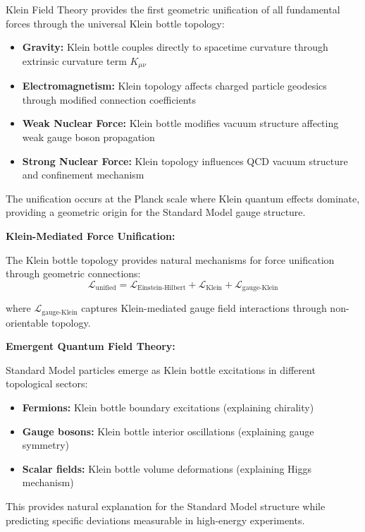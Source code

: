 \documentclass[12pt]{iopart}
\begin{document}
Klein Field Theory provides the first geometric unification of all fundamental forces through the universal Klein bottle topology:

\begin{itemize}
\item \textbf{Gravity:} Klein bottle couples directly to spacetime curvature through extrinsic curvature term $K_{\mu\nu}$
\item \textbf{Electromagnetism:} Klein topology affects charged particle geodesics through modified connection coefficients  
\item \textbf{Weak Nuclear Force:} Klein bottle modifies vacuum structure affecting weak gauge boson propagation
\item \textbf{Strong Nuclear Force:} Klein topology influences QCD vacuum structure and confinement mechanism
\end{itemize}

The unification occurs at the Planck scale where Klein quantum effects dominate, providing a geometric origin for the Standard Model gauge structure.

\textbf{Klein-Mediated Force Unification:}

The Klein bottle topology provides natural mechanisms for force unification through geometric connections:
\begin{equation}
\mathcal{L}_{\text{unified}} = \mathcal{L}_{\text{Einstein-Hilbert}} + \mathcal{L}_{\text{Klein}} + \mathcal{L}_{\text{gauge-Klein}}
\end{equation}

where $\mathcal{L}_{\text{gauge-Klein}}$ captures Klein-mediated gauge field interactions through non-orientable topology.

\textbf{Emergent Quantum Field Theory:}

Standard Model particles emerge as Klein bottle excitations in different topological sectors:
\begin{itemize}
\item \textbf{Fermions:} Klein bottle boundary excitations (explaining chirality)
\item \textbf{Gauge bosons:} Klein bottle interior oscillations (explaining gauge symmetry)
\item \textbf{Scalar fields:} Klein bottle volume deformations (explaining Higgs mechanism)
\end{itemize}

This provides natural explanation for the Standard Model structure while predicting specific deviations measurable in high-energy experiments.
\end{document}
